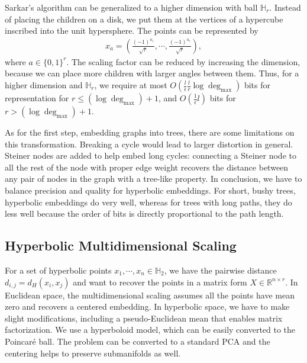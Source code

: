 Sarkar's algorithm can be generalized to a higher dimension with ball $\mathbb{H}_r$. Instead of placing the children on a disk, we put them at the vertices of a hypercube inscribed into the unit hypersphere. The points can be represented by
\begin{align*}
    x_a = \left(\frac{(-1)^{a_1}}{\sqrt{r}}, \cdots, \frac{(-1)^{a_r}}{\sqrt{r}}\right),
\end{align*}
where $a \in \{0, 1\}^r$. The scaling factor can be reduced by increasing the dimension, because we can place more children with larger angles between them. Thus, for a higher dimension and $\mathbb{H}_r$, we require at most $O(\frac{l}{\epsilon} \frac{l}{r} \log \deg_{\max})$ bits for representation for $r \leq (\log \deg_{\max}) + 1$, and $O(\frac{1}{\epsilon}l)$ bits for $r > (\log \deg_{\max}) + 1$.  

As for the first step, embedding graphs into trees, there are some limitations on this transformation. Breaking a cycle would lead to larger distortion in general. Steiner nodes are added to help embed long cycles: connecting a Steiner node to all the rest of the node with proper edge weight recovers the distance between any pair of nodes in the graph with a tree-like property. In conclusion, we have to balance precision and quality for hyperbolic embeddings. For short, bushy trees, hyperbolic embeddings do very well, whereas for trees with long paths, they do less well because the order of bits is directly proportional to the path length. 

\subsection{Hyperbolic Multidimensional Scaling}

For a set of hyperbolic points $x_1, \cdots, x_n \in \mathbb{H}_2$, we have the pairwise distance $d_{i, j} = d_H(x_i, x_j)$ and want to recover the points in a matrix form $X \in \mathbb{R}^{n \times r}$. In Euclidean space, the multidimensional scaling assumes all the points have mean zero and recovers a centered embedding. In hyperbolic space, we have to make slight modifications, including a pseudo-Euclidean mean that enables matrix factorization. We use a hyperboloid model, which can be easily converted to the Poincar\'e ball. The problem can be converted to a standard PCA and the centering helps to preserve submanifolds as well.

